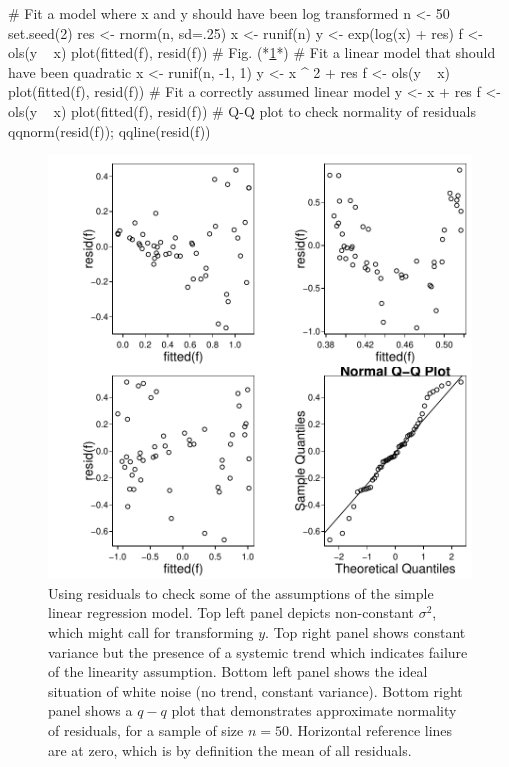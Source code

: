 \begin{Schunk}
\begin{Sinput}
# Fit a model where x and y should have been log transformed
n <- 50
set.seed(2)
res <- rnorm(n, sd=.25)
x <- runif(n)
y <- exp(log(x) + res)
f <- ols(y ~ x)
plot(fitted(f), resid(f))    # Fig. (*\ref{fig:reg-exresid}*)
# Fit a linear model that should have been quadratic
x <- runif(n, -1, 1)
y <- x ^ 2 + res
f <- ols(y ~ x)
plot(fitted(f), resid(f))
# Fit a correctly assumed linear model
y <- x + res
f <- ols(y ~ x)
plot(fitted(f), resid(f))
# Q-Q plot to check normality of residuals
qqnorm(resid(f)); qqline(resid(f))
\end{Sinput}
\begin{figure}[htbp]

\centerline{\includegraphics{reg-exresid-1} }

\caption[Four examples of residual plots]{Using residuals to check some of the assumptions of the simple linear regression model.  Top left panel depicts non-constant $\sigma^2$, which might call for transforming $y$.  Top right panel shows constant variance but the presence of a systemic trend which indicates failure of the linearity assumption.  Bottom left panel shows the ideal situation of white noise (no trend, constant variance).  Bottom right panel shows a $q-q$ plot that demonstrates approximate normality of residuals, for a sample of size $n=50$.  Horizontal reference lines are at zero, which is by definition the mean of all residuals.}\label{fig:reg-exresid}
\end{figure}
\end{Schunk}
\clearpage

